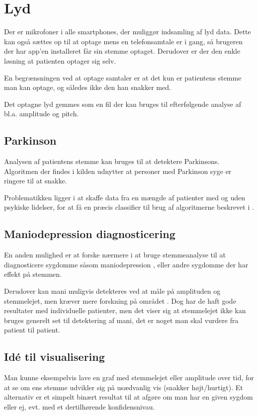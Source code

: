 \section{Lyd}
Der er mikrofoner i alle smartphones, der muliggør indsamling af lyd data.
Dette kan også sættes op til at optage mens en telefonsamtale er i gang, så brugeren der har app'en installeret får sin stemme optaget.
Derudover er der den enkle løsning at patienten optager sig selv.

En begrænsningen ved at optage samtaler er at det kun er patientens stemme man kan optage, og således ikke den han snakker med.

Det optagne lyd gemmes som en fil der kan bruges til efterfølgende analyse af bl.a. amplitude og pitch.

\subsection{Parkinson}
Analysen af patientens stemme kan bruges til at detektere Parkinsons\citep{6168572}.
Algoritmen der findes i kilden udnytter at personer med Parkinson syge er ringere til at snakke.

Problematikken ligger i at skaffe data fra en mængde af patienter med og uden psykiske lidelser, for at få en præcis classifier til brug af algoritmerne beskrevet i \citep{6168572,6346375}.

\subsection{Maniodepression diagnosticering}
En anden mulighed er at forske nærmere i at bruge stemmeanalyse til at diagnosticere sygdomme såsom maniodepression \citep{6346375}, eller andre sygdomme der har effekt på stemmen.

Derudover kan mani muligvis detekteres ved at måle på amplituden og stemmelejet, men kræver mere forskning på området \citep{6346375}.
Dog har de haft gode resultater med individuelle patienter, men det viser sig at stemmelejet ikke kan bruges generelt set til detektering af mani, det er noget man skal vurdere fra patient til patient.
	
\subsection{Idé til visualisering}
Man kunne eksempelvis lave en graf med stemmelejet eller amplitude over tid, for at se om ens stemme udvikler sig på usædvanlig vis (snakker højt/hurtigt).
Et alternativ er et simpelt binært resultat til at afgøre om man har en given sygdom eller ej, evt. med et dertilhørende konfidensnivau.
